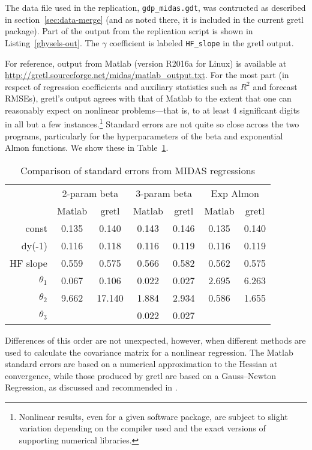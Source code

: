 The data file used in the replication, \texttt{gdp\_midas.gdt}, was
contructed as described in section~\ref{sec:data-merge} (and as noted
there, it is included in the current gretl package). Part of the
output from the replication script is shown in
Listing~\ref{ghysels-out}. The $\gamma$ coefficient is labeled
\texttt{HF\_slope} in the gretl output.

For reference, output from \textsf{Matlab} (version R2016a for Linux)
is available at
\url{http://gretl.sourceforge.net/midas/matlab_output.txt}. For the
most part (in respect of regression coefficients and auxiliary
statistics such as $R^2$ and forecast RMSEs), gretl's output agrees
with that of \textsf{Matlab} to the extent that one can reasonably
expect on nonlinear problems---that is, to at least 4 significant
digits in all but a few instances.\footnote{Nonlinear results, even
  for a given software package, are subject to slight variation
  depending on the compiler used and the exact versions of supporting
  numerical libraries.}  Standard errors are not quite so close across
the two programs, particularly for the hyperparameters of the beta and
exponential Almon functions. We show these in Table~\ref{tab:stderrs}.

\begin{table}[hbtp]
  \centering
  \begin{tabular}{rcccccc}
 & \multicolumn{2}{c}{2-param beta \qquad} & 
  \multicolumn{2}{c}{3-param beta \qquad} &
  \multicolumn{2}{c}{Exp Almon \qquad} \\[4pt]
 & \textsf{Matlab} & \textsf{gretl} & 
   \textsf{Matlab} & \textsf{gretl} &
   \textsf{Matlab} & \textsf{gretl} \\
const    & 0.135 & 0.140 & 0.143 & 0.146 & 0.135 & 0.140 \\
dy(-1)   & 0.116 & 0.118 & 0.116 & 0.119 & 0.116 & 0.119 \\
HF slope & 0.559 & 0.575 & 0.566 & 0.582 & 0.562 & 0.575 \\
$\theta_1$ & 0.067 & 0.106 & 0.022 & 0.027 & 2.695 & 6.263 \\
$\theta_2$ & 9.662 & 17.140 & 1.884 & 2.934 & 0.586 & 1.655 \\
$\theta_3$ &        &	     & 0.022 & 0.027 \\
\end{tabular}
  \caption{Comparison of standard errors from MIDAS regressions}
  \label{tab:stderrs}
\end{table}

Differences of this order are not unexpected, however, when different
methods are used to calculate the covariance matrix for a nonlinear
regression. The \textsf{Matlab} standard errors are based on a
numerical approximation to the Hessian at convergence, while those
produced by gretl are based on a Gauss--Newton Regression, as
discussed and recommended in \citet[chapter 6]{davidson-mackinnon04}.


